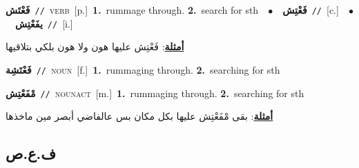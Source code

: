 \documentclass[10pt,a4paper,twoside]{article} %
\begin{document}
\begin{multicols}{2}
{\setlength\topsep{0pt}\textbf{\foreignlanguage{arabic}{فَعْتَش}}\ {\color{gray}\texttt{//}\color{black}}\ \textsc{verb}\ [p.]\ \textbf{1.}~rummage through.  \textbf{2.}~search for sth\ \ $\bullet$\ \ \setlength\topsep{0pt}\textbf{\foreignlanguage{arabic}{فَعْتِش}}\ {\color{gray}\texttt{//}\color{black}}\ [c.]\ \ $\bullet$\ \ \setlength\topsep{0pt}\textbf{\foreignlanguage{arabic}{يفَعْتِش}}\ {\color{gray}\texttt{//}\color{black}}\ [i.]\  \begin{flushright}\color{gray}\foreignlanguage{arabic}{\textbf{\underline{\foreignlanguage{arabic}{أمثلة}}}: فَعْتِش عليها هون ولا هون بلكي بتلاقيها}\end{flushright}\color{black}} \vspace{2mm}

{\setlength\topsep{0pt}\textbf{\foreignlanguage{arabic}{فَعْتَشِة}}\ {\color{gray}\texttt{//}\color{black}}\ \textsc{noun}\ [f.]\ \textbf{1.}~rummaging through.  \textbf{2.}~searching for sth\ } \vspace{2mm}

{\setlength\topsep{0pt}\textbf{\foreignlanguage{arabic}{مْفَعْتِش}}\ {\color{gray}\texttt{//}\color{black}}\ \textsc{noun\textunderscore act}\ [m.]\ \textbf{1.}~rummaging through.  \textbf{2.}~searching for sth\  \begin{flushright}\color{gray}\foreignlanguage{arabic}{\textbf{\underline{\foreignlanguage{arabic}{أمثلة}}}: بقى مْفَعْتِش عليها بكل مكان بس عالفاضي أبصر مين ماخذها}\end{flushright}\color{black}} \vspace{2mm}

\vspace{-3mm}
\subsection*{\color{blue}\foreignlanguage{arabic}{ف.ع.ص}\color{blue}{}} 


\end{multicols}
\end{document}

